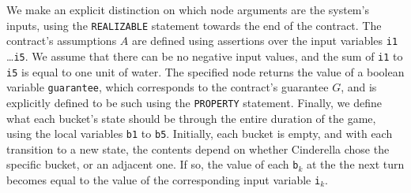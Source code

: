We make an explicit distinction on which node arguments are the system's inputs, using the \texttt{REALIZABLE} statement towards the end of the contract. The contract's
assumptions $A$ are defined using assertions over the input variables
\texttt{i1} \ldots \texttt{i5}. We assume that there can be no negative input values, and the
sum of \texttt{i1} to \texttt{i5} is equal to one unit of water. The specified node
returns the value of a boolean variable \texttt{guarantee}, which corresponds to
the contract's guarantee $G$, and is explicitly defined to be such using the
\texttt{PROPERTY} statement. Finally, we define what each bucket's state should be through the entire
duration of the game, using the local variables \texttt{b1} to \texttt{b5}.
Initially, each bucket is empty, and with each transition to a new state, the contents depend on
whether Cinderella chose the specific bucket, or an adjacent one. If so, the value of each \texttt{b}$_k$ at the the next turn becomes equal to the value of the corresponding input variable \texttt{i}$_k$.

